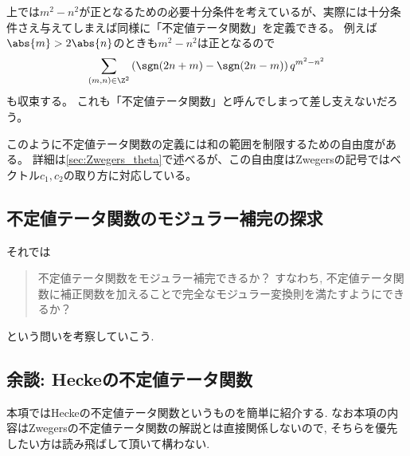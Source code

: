 \documentclass[11pt,b5paper,oneside,lualatex]{ltjsarticle} %
\numberwithin{equation}{section} %
\begin{document}
\begin{rem}
	上では$ m^2 - n^2 $が正となるための必要十分条件を考えているが、実際には十分条件さえ与えてしまえば同様に「不定値テータ関数」を定義できる。
	例えば$ \abs{m} > 2\abs{n} $のときも$ m^2 - n^2 $は正となるので
	\[
	\sum_{(m, n) \in \Z^2} \left( \sgn(2n+m) - \sgn(2n-m) \right) q^{m^2 - n^2}
	\]
	も収束する。
	これも「不定値テータ関数」と呼んでしまって差し支えないだろう。
	
	このように不定値テータ関数の定義には和の範囲を制限するための自由度がある。
	詳細は\cref{sec:Zwegers_theta}で述べるが、この自由度はZwegersの記号ではベクトル$ c_1, c_2 $の取り方に対応している。
\end{rem}



\subsection{不定値テータ関数のモジュラー補完の探求} \label{subsec:}


それでは
\begin{quote}
	\centering
	不定値テータ関数をモジュラー補完できるか？
	すなわち, 不定値テータ関数に補正関数を加えることで完全なモジュラー変換則を満たすようにできるか？
\end{quote}
という問いを考察していこう. 













\subsection{余談: Heckeの不定値テータ関数} \label{subsec:Hecke_theta}


本項ではHeckeの不定値テータ関数というものを簡単に紹介する. 
なお本項の内容はZwegersの不定値テータ関数の解説とは直接関係しないので, そちらを優先したい方は読み飛ばして頂いて構わない. 
\end{document}
